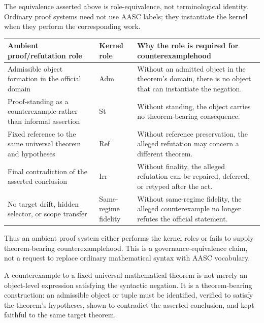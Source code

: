\begin{tcolorbox}[breakable, title={Role-equivalence table for ambient counterexamplehood}, colback=cyan!1!white, colframe=cyan!45!black]
\small
The equivalence asserted above is role-equivalence, not terminological identity. Ordinary proof systems need not use AASC labels; they instantiate the kernel when they perform the corresponding work.
\begin{center}
\scriptsize
\renewcommand{\arraystretch}{1.12}
\begin{tabularx}{0.98\textwidth}{@{}L{0.34\textwidth}L{0.18\textwidth}Y@{}}
\toprule
\textbf{Ambient proof/refutation role} & \textbf{Kernel role} & \textbf{Why the role is required for counterexamplehood}\\
\midrule
Admissible object formation in the official domain & Adm & Without an admitted object in the theorem's domain, there is no object that can instantiate the negation.\\
Proof-standing as a counterexample rather than informal assertion & St & Without standing, the object carries no theorem-bearing consequence.\\
Fixed reference to the same universal theorem and hypotheses & Ref & Without reference preservation, the alleged refutation may concern a different theorem.\\
Final contradiction of the asserted conclusion & Irr & Without finality, the alleged refutation can be repaired, deferred, or retyped after the act.\\
No target drift, hidden selector, or scope transfer & Same-regime fidelity & Without same-regime fidelity, the alleged counterexample no longer refutes the official statement.\\
\bottomrule
\end{tabularx}
\end{center}
Thus an ambient proof system either performs the kernel roles or fails to supply theorem-bearing counterexamplehood. This is a governance-equivalence claim, not a request to replace ordinary mathematical syntax with AASC vocabulary.
\end{tcolorbox}

\begin{manuallemma}
\label{lem:counterexamplehood-theorem-bearing-construction}
A counterexample to a fixed universal mathematical theorem is not merely an object-level expression satisfying the syntactic negation. It is a theorem-bearing construction: an admissible object or tuple must be identified, verified to satisfy the theorem's hypotheses, shown to contradict the asserted conclusion, and kept faithful to the same target theorem.
\end{manuallemma}

